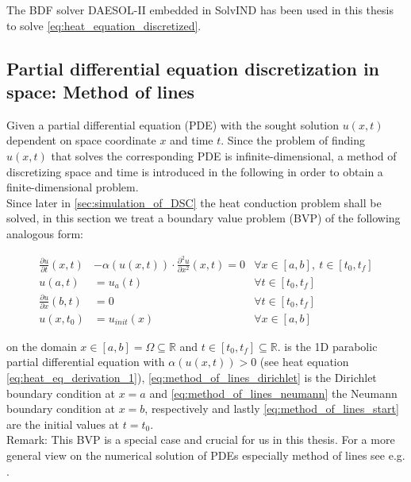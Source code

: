 \documentclass{scrartcl}[12pt, halfparskip]
\numberwithin{equation}{section}
\numberwithin{figure}{section}
\numberwithin{table}{section}
\begin{document}
The BDF solver DAESOL-II embedded in SolvIND has been used in this thesis to solve \cref{eq:heat_equation_discretized}.





\newpage
\subsection{Partial differential equation discretization in space: Method of lines}
\label{sec:pde_discretization}


Given a partial differential equation (PDE) with the sought solution $u(x,t)$ dependent on space coordinate $x$ and time $t$. Since the problem of finding $u(x,t)$ that solves the corresponding PDE is infinite-dimensional, a method of discretizing space and time is introduced in the following in order to obtain a finite-dimensional problem. \\
Since later in \cref{sec:simulation_of_DSC} the heat conduction problem shall be solved, in this section we treat a boundary value problem (BVP) of the following analogous form:

\begin{subequations}
	\begin{align}
	\frac{\partial u}{\partial t}(x,t) & - \alpha(u(x,t)) \cdot \frac{\partial^2 u}{\partial x^2}(x,t) = 0 & \forall x \in [a,b], \ t \in [t_0,t_f] \label{eq:method_of_lines_pde} \\
	u(a,t) & = u_a(t)  & \forall t \in [t_0,t_f] \label{eq:method_of_lines_dirichlet} \\
	\frac{\partial u}{\partial x}(b,t) & = 0  & \forall t \in [t_0,t_f] \label{eq:method_of_lines_neumann}  \\
	u(x,t_0) & = u_{init}(x) & \forall x \in [a,b] \label{eq:method_of_lines_start}
	\end{align}
	\label{eq:method_of_lines}
\end{subequations}

on the domain $x \in [a,b] = \Omega \subseteq \mathbb{R}$ and $t \in [t_0,t_f] \subseteq \mathbb{R}$.  is the 1D parabolic partial differential equation with $\alpha(u(x,t)) > 0$ (see heat equation \eqref{eq:heat_eq_derivation_1}), \cref{eq:method_of_lines_dirichlet} is the Dirichlet boundary condition at $x=a$ and \cref{eq:method_of_lines_neumann} the Neumann boundary condition at $x=b$, respectively and lastly \cref{eq:method_of_lines_start} are the initial values at ${t=t_0}$. \\
Remark: This BVP is a special case and crucial for us in this thesis. For a more general view on the numerical solution of PDEs especially method of lines see e.g. \cite{pde_buch_solin}. \\
\end{document}
